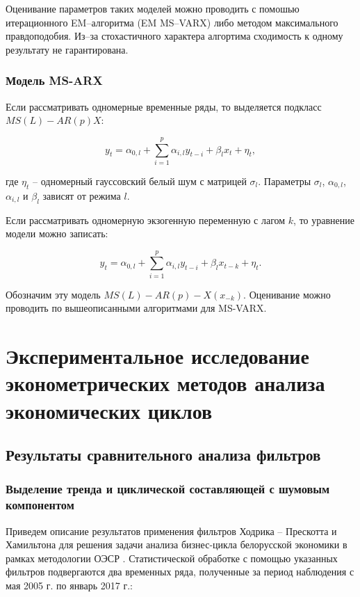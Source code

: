 \documentclass[a4paper,14pt]{extreport}
\begin{document}
	Оценивание параметров таких моделей можно проводить с помошью итерационного EM--алгоритма (EM MS--VARX) \cite{malNovopMSVARX} либо методом максимального правдоподобия. Из--за стохастичного характера алгортима сходимость к одному результату не гарантирована.
	
	
	\subsection{Модель MS-ARX}
	
	Если рассматривать одномерные временные ряды, то выделяется подкласс $MS(L)-AR(p)X$:
	
	\begin{equation}  
	y_{t} = \alpha_{0,l} + \sum_{i=1}^{p} \alpha_{i,l} y_{t-i} + \beta_{l} x_{t} + \eta_{t},
	\label{eq:msarx_base}
	\end{equation}
	
	где $\eta_{t}$ -- одномерный гауссовский белый шум с матрицей $\sigma_{l}$. Параметры $\sigma_{l}$, $\alpha_{0,l}$, $\alpha_{i,l}$ и $\beta_{l}$ зависят от режима $l$.
	
	Если рассматривать одномерную экзогенную переменную с лагом $k$, то уравнение модели можно записать:
	
	\begin{equation}  
	y_{t} = \alpha_{0,l} + \sum_{i=1}^{p} \alpha_{i,l} y_{t-i} + \beta_{l} x_{t-k} + \eta_{t}.
	\label{eq:gen-msarx}
	\end{equation}
	
	Обозначим эту модель $MS(L)-AR(p)-X({x}_{-k})$. Оценивание можно проводить по вышеописанными алгоритмами для MS-VARX.
	
	
	\chapter{Экспериментальное исследование эконометрических методов анализа экономических циклов}
	
	\section{Результаты сравнительного анализа фильтров}
	
	\subsection{Выделение тренда и циклической составляющей с шумовым компонентом}
	
	Приведем описание результатов применения фильтров Ходрика -- Прескотта и Хамильтона для решения задачи анализа бизнес-цикла белорусской экономики в рамках методологии ОЭСР \cite{oecdCycleExtraction}. Статистической обработке с помощью указанных фильтров подвергаются два временных ряда, полученные за период наблюдения с мая 2005 г. по январь 2017 г.: 
	
\end{document}
